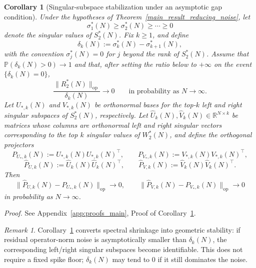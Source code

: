 \documentclass[11pt]{article}
\theoremstyle{plain}
\newtheorem{cor}[thm]{Corollary}
\theoremstyle{definition}
\theoremstyle{remark}
\newtheorem{rem}[thm]{Remark}
\newcommand{\R}{\mathbb{R}}
\newcommand{\PP}{\mathbb{P}}
\newcommand{\op}{\mathrm{op}}
\newcommand{\1}{\mathbf{1}}
\newcommand{\proofloc}[1]{\par\noindent\emph{Proof.} #1\par}
\begin{document}
\begin{cor}[Singular-subspace stabilization under an asymptotic gap condition]
\label{cor:subspace_stabilization}
Under the hypotheses of Theorem~\ref{main_result_reducing_noise}, let
\[
\sigma_1^*(N)\ge \sigma_2^*(N)\ge \cdots \ge 0
\]
denote the singular values of \(S_2^*(N)\). Fix \(k\ge1\), and define
\[
\delta_k(N):=
\sigma_k^*(N)-\sigma_{k+1}^*(N),
\]
with the convention \(\sigma_j^*(N)=0\) for \(j\) beyond the rank of \(S_2^*(N)\). Assume that \(\PP(\delta_k(N)>0)\to1\) and that, after setting the ratio below to \(+\infty\) on the event \(\{\delta_k(N)=0\}\),
\[
\frac{\|R_2^*(N)\|_{\op}}{\delta_k(N)}\to 0
\qquad\text{in probability as }N\to\infty.
\]
Let \(U_{*,k}(N)\) and \(V_{*,k}(N)\) be orthonormal bases for the top-\(k\) left and right singular subspaces of \(S_2^*(N)\), respectively.
Let \(\widehat U_k(N),\widehat V_k(N)\in\R^{N\times k}\) be matrices whose columns are orthonormal left and right singular vectors corresponding to the top \(k\) singular values of \(W_2^*(N)\), and define the orthogonal projectors
\[
P_{U_*,k}(N):=U_{*,k}(N)U_{*,k}(N)^\top,
\qquad
P_{V_*,k}(N):=V_{*,k}(N)V_{*,k}(N)^\top,
\]
\[
\widehat P_{U,k}(N):=\widehat U_k(N)\widehat U_k(N)^\top,
\qquad
\widehat P_{V,k}(N):=\widehat V_k(N)\widehat V_k(N)^\top.
\]
Then
\[
\|\widehat P_{U,k}(N)-P_{U_*,k}(N)\|_{\op}\to0,
\qquad
\|\widehat P_{V,k}(N)-P_{V_*,k}(N)\|_{\op}\to0
\]
in probability as \(N\to\infty\).
\end{cor}
\proofloc{See Appendix~\ref{app:proofs_main}, Proof of Corollary~\ref{cor:subspace_stabilization}.}

\begin{rem}
Corollary~\ref{cor:subspace_stabilization} converts spectral shrinkage into geometric stability: if residual operator-norm noise is asymptotically smaller than \(\delta_k(N)\), the corresponding left/right singular subspaces become identifiable. This does not require a fixed spike floor; \(\delta_k(N)\) may tend to \(0\) if it still dominates the noise.
\end{rem}
\end{document}
